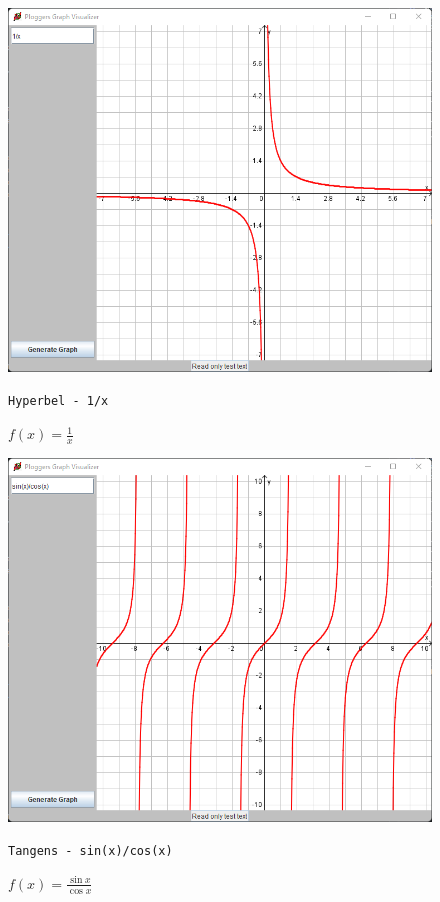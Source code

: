 \documentclass[12pt]{article}
\begin{document}
	\begin{figure}[!ht]
		\begin{center}
		\includegraphics[scale=0.75]{images/sample2.png}
		\end{center}
		\caption{$f(x) = \frac{1}{x}$}

		\begin{center}
			\texttt{Hyperbel - 1/x}
		\end{center}
	\end{figure}

	\begin{figure}[!ht]
		\begin{center}
		\includegraphics[scale=0.75]{images/sample3.png}
		\end{center}
		\caption{$f(x) = \frac{\sin{x}}{\cos{x}}$}

		\begin{center}
			\texttt{Tangens - sin(x)/cos(x)}
		\end{center}
	\end{figure}
\end{document}
